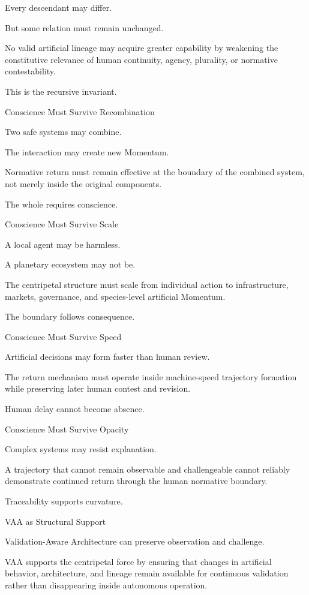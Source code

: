 Every descendant may differ.

But some relation must remain unchanged.

No valid artificial lineage may acquire greater capability by weakening the constitutive relevance of human continuity, agency, plurality, or normative contestability.

This is the recursive invariant.

Conscience Must Survive Recombination

Two safe systems may combine.

The interaction may create new Momentum.

Normative return must remain effective at the boundary of the combined system, not merely inside the original components.

The whole requires conscience.

Conscience Must Survive Scale

A local agent may be harmless.

A planetary ecosystem may not be.

The centripetal structure must scale from individual action to infrastructure, markets, governance, and species-level artificial Momentum.

The boundary follows consequence.

Conscience Must Survive Speed

Artificial decisions may form faster than human review.

The return mechanism must operate inside machine-speed trajectory formation while preserving later human contest and revision.

Human delay cannot become absence.

Conscience Must Survive Opacity

Complex systems may resist explanation.

A trajectory that cannot remain observable and challengeable cannot reliably demonstrate continued return through the human normative boundary.

Traceability supports curvature.

VAA as Structural Support

Validation-Aware Architecture can preserve observation and challenge.

VAA supports the centripetal force by ensuring that changes in artificial behavior, architecture, and lineage remain available for continuous validation rather than disappearing inside autonomous operation.

